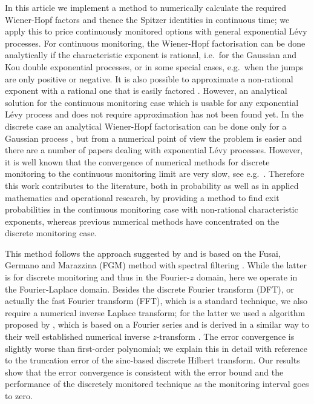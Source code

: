\documentclass[11pt,a4paper]{article}
\begin{document}
In this article we implement a method to numerically calculate the required Wiener-Hopf factors and thence the Spitzer identities in continuous time; we apply this to price continuously monitored options with general exponential L\'evy processes.
For continuous monitoring, the Wiener-Hopf factorisation can be done analytically if the characteristic exponent is rational, i.e.\ for the Gaussian and Kou double exponential processes, or in some special cases, e.g.\ when the jumps are only positive or negative. It is also possible to approximate a non-rational exponent with a rational one that is easily factored \citep{kuznetsov2010}. However, an analytical solution for the continuous monitoring case which is usable for any exponential L\'evy process and does not require approximation has not been found yet. In the discrete case an analytical Wiener-Hopf factorisation can be done only for a Gaussian process \citep{fusai2006exact}, but from a numerical point of view the problem is easier and there are a number of papers dealing with exponential L\'evy processes. However, it is well known that the convergence of numerical methods for discrete monitoring to the continuous monitoring limit are very slow, see e.g.~\cite{broadie1997}.
Therefore this work contributes to the literature, both in probability as well as in applied mathematics and operational research, by providing a method to find exit probabilities in the continuous monitoring case with non-rational characteristic exponents, whereas previous numerical methods have concentrated on the discrete monitoring case.

This method follows the approach suggested by \cite{Green2010} and is based on the Fusai, Germano and Marazzina (FGM) method \citep{Fusai2016} with spectral filtering \citep{Phelan2017}. While the latter is for discrete monitoring and thus in the Fourier-$z$ domain, here we operate in the Fourier-Laplace domain. Besides the discrete Fourier transform (DFT), or actually the fast Fourier transform (FFT), which is a standard technique, we also require a numerical inverse Laplace transform; for the latter we used a algorithm proposed by \cite{Abate1992_2,Abate1995}, which is based on a Fourier series and is derived in a similar way to their well established numerical inverse $z$-transform \citep{Abate1992}. The error convergence is slightly worse than first-order polynomial; we explain this in detail with reference to the truncation error of the sinc-based discrete Hilbert transform. Our results show that the error convergence is consistent with the error bound and the performance of the discretely monitored technique as the monitoring interval goes to zero.
\end{document}
